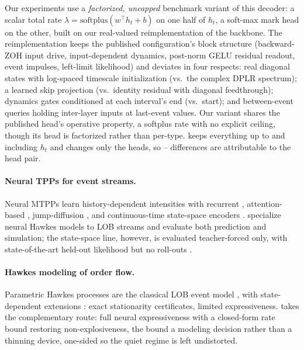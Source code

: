 Our experiments use a \emph{factorized, uncapped} benchmark variant of
this decoder: a scalar total rate
$\lambda=\mathrm{softplus}(w^{\!\top}h_t+b)$ on one half of $h_t$, a
soft-max mark head on the other, built on our real-valued reimplementation
of the backbone. The reimplementation keeps the published configuration's
block structure (backward-ZOH input drive, input-dependent dynamics,
post-norm GELU residual readout, event impulses, left-limit likelihood) and
deviates in four respects: real diagonal states with log-spaced timescale
initialization (vs.\ the complex DPLR spectrum); a learned skip projection
(vs.\ identity residual with diagonal feedthrough); dynamics gates
conditioned at each interval's end (vs.\ start); and between-event queries
holding inter-layer inputs at last-event values. Our variant
shares the published head's operative property, a softplus rate with no
explicit ceiling, though its head is factorized rather than per-type.
\ssppp{} keeps everything up to and including $h_t$ and changes only the
heads, so \ssppp{}--\sppp{} differences are attributable to the head pair.

\paragraph{Neural TPPs for event streams.}
Neural MTPPs learn history-dependent intensities with recurrent
\citep{du2016recurrent,Mei2017TheProcess}, attention-based
\citep{zhang2020self,zuo2020thp}, jump-diffusion \citep{zhang2024njdtpp}, and
continuous-time state-space \citep{chang2025ctssm} encoders
\citep[survey:][]{Shchur2021NeuralReview}. \citet{Shi2022StateSimulation}
specialize neural Hawkes models to LOB streams and evaluate both prediction
and simulation; the state-space line, however, is evaluated
teacher-forced only, with state-of-the-art held-out likelihood but no
roll-outs \citep{chang2025ctssm}.

\paragraph{Hawkes modeling of order flow.}
Parametric Hawkes processes are the classical LOB event model
\citep{Hawkes1971,Hawkes2018HawkesReview,Jain2024LimitProcess,jain2024review},
with state-dependent extensions
\citep{Morariu-Patrichi2022State-dependentModelling}: exact stationarity
certificates, limited expressiveness. \ssppp{} takes the complementary
route: full neural expressiveness with a closed-form rate bound restoring
non-explosiveness, the bound a modeling decision rather than a thinning
device, one-sided so the quiet regime is left undistorted.

